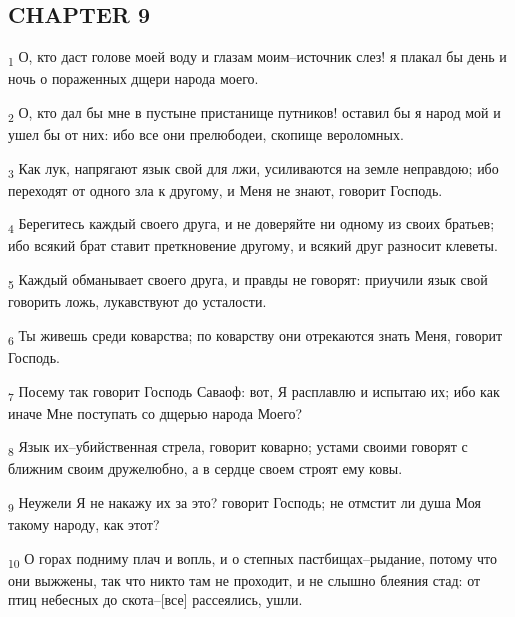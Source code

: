 \subsection{CHAPTER 9}
\begin{tcolorbox}
\textsubscript{1} О, кто даст голове моей воду и глазам моим--источник слез! я плакал бы день и ночь о пораженных дщери народа моего.
\end{tcolorbox}
\begin{tcolorbox}
\textsubscript{2} О, кто дал бы мне в пустыне пристанище путников! оставил бы я народ мой и ушел бы от них: ибо все они прелюбодеи, скопище вероломных.
\end{tcolorbox}
\begin{tcolorbox}
\textsubscript{3} Как лук, напрягают язык свой для лжи, усиливаются на земле неправдою; ибо переходят от одного зла к другому, и Меня не знают, говорит Господь.
\end{tcolorbox}
\begin{tcolorbox}
\textsubscript{4} Берегитесь каждый своего друга, и не доверяйте ни одному из своих братьев; ибо всякий брат ставит преткновение другому, и всякий друг разносит клеветы.
\end{tcolorbox}
\begin{tcolorbox}
\textsubscript{5} Каждый обманывает своего друга, и правды не говорят: приучили язык свой говорить ложь, лукавствуют до усталости.
\end{tcolorbox}
\begin{tcolorbox}
\textsubscript{6} Ты живешь среди коварства; по коварству они отрекаются знать Меня, говорит Господь.
\end{tcolorbox}
\begin{tcolorbox}
\textsubscript{7} Посему так говорит Господь Саваоф: вот, Я расплавлю и испытаю их; ибо как иначе Мне поступать со дщерью народа Моего?
\end{tcolorbox}
\begin{tcolorbox}
\textsubscript{8} Язык их--убийственная стрела, говорит коварно; устами своими говорят с ближним своим дружелюбно, а в сердце своем строят ему ковы.
\end{tcolorbox}
\begin{tcolorbox}
\textsubscript{9} Неужели Я не накажу их за это? говорит Господь; не отмстит ли душа Моя такому народу, как этот?
\end{tcolorbox}
\begin{tcolorbox}
\textsubscript{10} О горах подниму плач и вопль, и о степных пастбищах--рыдание, потому что они выжжены, так что никто там не проходит, и не слышно блеяния стад: от птиц небесных до скота--[все] рассеялись, ушли.
\end{tcolorbox}
